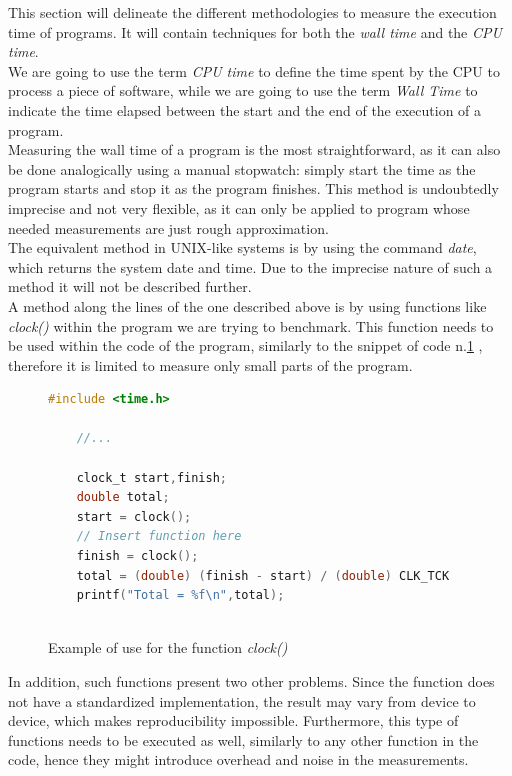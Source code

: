 This section will delineate the different methodologies to measure the execution time of programs. It will contain techniques for both the \textit{wall time} and the \textit{CPU time}. \\
We are going to use the term  \textit{CPU time} to define the time spent by the CPU to process a piece of software, while we are going to use the term \textit{Wall Time} to indicate the time elapsed between the start and the end of the execution of a program.\\\hfill
Measuring the wall time of a program is the most straightforward, as it can also be done analogically using a manual stopwatch: simply start the time as the program starts and stop it as the program finishes. This method is undoubtedly imprecise and not very flexible, as it can only be applied to program whose needed measurements are just rough approximation.\cite{Stewart2001MeasuringET}\\
The equivalent method in UNIX-like systems is by using the command \textit{date}, which returns the system date and time. Due to the imprecise nature of such a method it will not be described further. \\
A method along the lines of the one described above is by using functions like \textit{clock()} within the program we are trying to benchmark. This function needs to be used within the code of the program, similarly to the snippet of code n.\ref{fig:code} \cite{Stewart2001MeasuringET}, therefore it is limited to measure only small parts of the program. \\
\begin{figure}
\begin{lstlisting}[language=C, label= code]
    #include <time.h>
    
    //...
    
    clock_t start,finish;
    double total;
    start = clock();
    // Insert function here
    finish = clock();
    total = (double) (finish - start) / (double) CLK_TCK
    printf("Total = %f\n",total);
    
\end{lstlisting}
\caption{Example of use for the function \textit{clock()}}
\label{fig:code}
\end{figure}
In addition, such functions present two other problems. Since the function does not have a standardized implementation, the result may vary from device to device, which makes reproducibility impossible. 
Furthermore, this type of functions needs to be executed as well, similarly to any other function in the code, hence they might introduce overhead and noise in the measurements. \\

